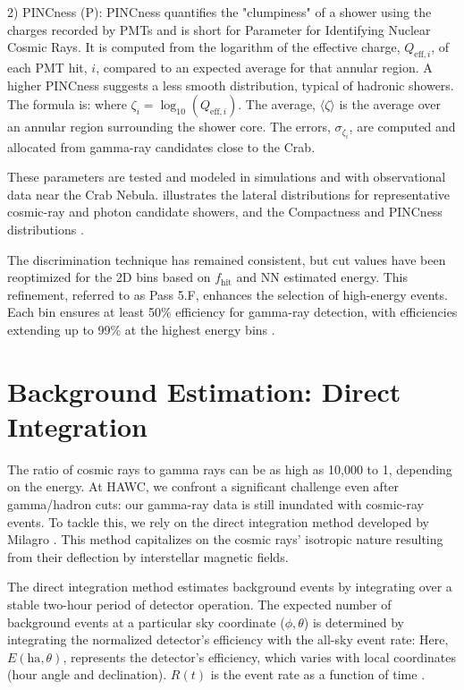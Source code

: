 2) PINCness (P): PINCness quantifies the "clumpiness" of a shower using the charges recorded by PMTs and is short for Parameter for Identifying Nuclear Cosmic Rays.
It is computed from the logarithm of the effective charge, $Q_{\mathrm{eff},i}$, of each PMT hit, $i$, compared to an expected average for that annular region.
A higher PINCness suggests a less smooth distribution, typical of hadronic showers.
The formula is:
\pincness
where $\zeta_i = \log_{10}(Q_{\mathrm{eff},i})$.
The average, $\langle \zeta \rangle$ is the average over an annular region surrounding the shower core.
The errors, $\sigma_{\zeta_i}$, are computed and allocated from gamma-ray candidates close to the Crab.

These parameters are tested and modeled in simulations and with observational data near the Crab Nebula.
 illustrates the lateral distributions for representative cosmic-ray and photon candidate showers, and the Compactness and PINCness distributions \cite{Abeysekara_2017}.

The discrimination technique has remained consistent, but cut values have been reoptimized for the 2D bins based on $f_{\text{hit}}$ and NN estimated energy.
This refinement, referred to as Pass 5.F, enhances the selection of high-energy events.
Each bin ensures at least 50\% efficiency for gamma-ray detection, with efficiencies extending up to 99\% at the highest energy bins \cite{Abeysekara_2017,100TEV_Crab_HAWC}.

\section{Background Estimation: Direct Integration}\label{hawc:direc_int}

The ratio of cosmic rays to gamma rays can be as high as 10,000 to 1, depending on the energy.
At HAWC, we confront a significant challenge even after gamma/hadron cuts: our gamma-ray data is still inundated with cosmic-ray events.
To tackle this, we rely on the direct integration method developed by Milagro \cite{Milagro_crab}.
This method capitalizes on the cosmic rays' isotropic nature resulting from their deflection by interstellar magnetic fields.

The direct integration method estimates background events by integrating over a stable two-hour period of detector operation.
The expected number of background events at a particular sky coordinate ($\phi, \theta$) is determined by integrating the normalized detector's efficiency with the all-sky event rate:
\directInt
Here, $E(\text{ha}, \theta)$, represents the detector's efficiency, which varies with local coordinates (hour angle and declination).
$R(t)$ is the event rate as a function of time \cite{Milagro_crab}.

